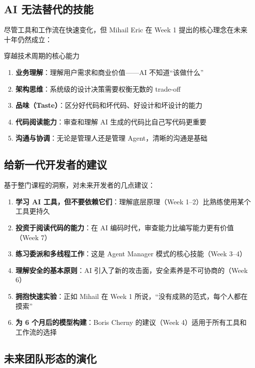 \documentclass[a4paper]{article}
\begin{document}
\subsection{AI 无法替代的技能}

尽管工具和工作流在快速变化，但 Mihail Eric 在 Week 1 提出的核心理念在未来十年仍然成立：

\begin{importantbox}{穿越技术周期的核心能力}
\begin{enumerate}
    \item \textbf{业务理解}：理解用户需求和商业价值——AI 不知道``该做什么''
    \item \textbf{架构思维}：系统级的设计决策需要权衡无数的 trade-off
    \item \textbf{品味（Taste）}：区分好代码和坏代码、好设计和坏设计的能力
    \item \textbf{代码阅读能力}：审查和理解 AI 生成的代码比自己写代码更重要
    \item \textbf{沟通与协调}：无论是管理人还是管理 Agent，清晰的沟通是基础
\end{enumerate}
\end{importantbox}

\subsection{给新一代开发者的建议}

基于整门课程的洞察，对未来开发者的几点建议：

\begin{enumerate}
    \item \textbf{学习 AI 工具，但不要依赖它们}：理解底层原理（Week 1--2）比熟练使用某个工具更持久
    \item \textbf{投资于阅读代码的能力}：在 AI 编码时代，审查能力比编写能力更有价值（Week 7）
    \item \textbf{练习委派和多线程工作}：这是 Agent Manager 模式的核心技能（Week 3--4）
    \item \textbf{理解安全的基本原则}：AI 引入了新的攻击面，安全素养是不可协商的（Week 6）
    \item \textbf{拥抱快速实验}：正如 Mihail 在 Week 1 所说，``没有成熟的范式，每个人都在摸索''
    \item \textbf{为 6 个月后的模型构建}：Boris Cherny 的建议（Week 4）适用于所有工具和工作流的选择
\end{enumerate}

\subsection{未来团队形态的演化}
\end{document}
